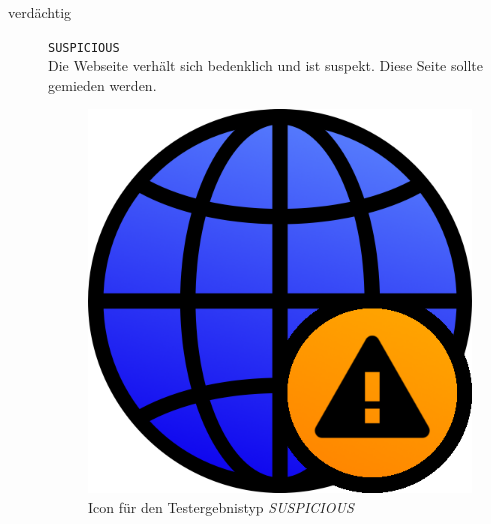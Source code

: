 \begin{description}
	\item[verdächtig] \hfill \texttt{SUSPICIOUS} \\
	Die Webseite verhält sich bedenklich und ist suspekt.
	Diese Seite sollte gemieden werden.
    \begin{figure}[H]
    	\centering
    	\includegraphics[scale=0.2]{images/webifier-suspicious}
    	\caption{Icon für den Testergebnistyp \textit{SUSPICIOUS}}
    \end{figure}


\end{description}
